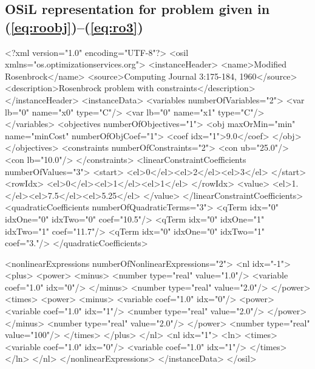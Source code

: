 \documentclass[11pt]{article}
\renewcommand{\_}{{\char"5F}}
\renewcommand{\{}{{\char"7B}}
\renewcommand{\}}{{\char"7D}}
\renewcommand{\^}{{\char"0D}}
\renewcommand{\'}{{\char"0D}}
\begin{document}
\subsection{OSiL representation for problem given in (\ref{eq:roobj})--(\ref{eq:ro3})}\label{section:rosenbrockXML}


{\normalsize \baselineskip 16pt \vspace{2pt}
\begin{verbatimtab}[5]
<?xml version="1.0" encoding="UTF-8"?>
<osil xmlns="os.optimizationservices.org">
	<instanceHeader>
		<name>Modified Rosenbrock</name>
		<source>Computing Journal 3:175-184, 1960</source>
		<description>Rosenbrock problem with constraints</description>
	</instanceHeader>
	<instanceData>
		<variables numberOfVariables="2">
			<var lb="0" name="x0" type="C"/>
			<var lb="0" name="x1" type="C"/>
		</variables>
		<objectives numberOfObjectives="1">
			<obj maxOrMin="min" name="minCost" numberOfObjCoef="1">
				<coef idx="1">9.0</coef>
			</obj>
		</objectives>
		<constraints numberOfConstraints="2">
			<con ub="25.0"/>
			<con lb="10.0"/>
		</constraints>
		<linearConstraintCoefficients numberOfValues="3">
			<start>
				<el>0</el><el>2</el><el>3</el>
			</start>
			<rowIdx>
				<el>0</el><el>1</el><el>1</el>
			</rowIdx>
			<value>
				<el>1.</el><el>7.5</el><el>5.25</el>
			</value>
		</linearConstraintCoefficients>
		<quadraticCoefficients numberOfQuadraticTerms="3">
			<qTerm idx="0" idxOne="0" idxTwo="0" coef="10.5"/>
			<qTerm idx="0" idxOne="1" idxTwo="1" coef="11.7"/>
			<qTerm idx="0" idxOne="0" idxTwo="1" coef="3."/>
		</quadraticCoefficients>
\end{verbatimtab}
   \newpage
\begin{verbatimtab}[5]
		<nonlinearExpressions numberOfNonlinearExpressions="2">
			<nl idx="-1">
				<plus>
					<power>
						<minus>
							<number type="real" value="1.0"/>
							<variable coef="1.0" idx="0"/>
						</minus>
						<number type="real" value="2.0"/>
					</power>
					<times>
						<power>
							<minus>
								<variable coef="1.0" idx="0"/>
								<power>
									<variable coef="1.0" idx="1"/>
									<number type="real" value="2.0"/>
								</power>
							</minus>
							<number type="real" value="2.0"/>
						</power>
						<number type="real" value="100"/>
					</times>
				</plus>
			</nl>
			<nl idx="1">
				<ln>
					<times>
						<variable coef="1.0" idx="0"/>
						<variable coef="1.0" idx="1"/>
					</times>
				</ln>
			</nl>
		</nonlinearExpressions>
	</instanceData>
</osil>
\end{verbatimtab}

}%
\end{document}
